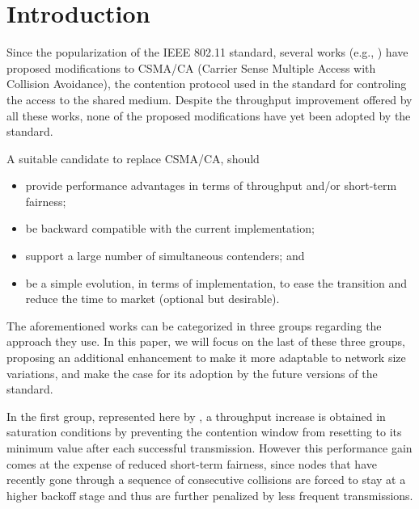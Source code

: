 \documentclass[conference]{IEEEtran}
\begin{document}
%
\IEEEpeerreviewmaketitle



\section{Introduction}

Since the popularization of the IEEE 802.11 standard, several works (e.g.,  \cite{bharghavan1994map,wang2004ncr,cali2000dti,lopez-toledo2006aoi,
barcelo2008lba,bellalta2009vtc,he2009srb,barcelo2010fcc,fang2011dlm,hui2011epp,barcelo2011tcf}) have proposed modifications to CSMA/CA (Carrier Sense Multiple Access with Collision Avoidance), the contention protocol used in the standard for controling the access to the shared medium. {Despite the throughput improvement offered by all these works, none of the proposed modifications have yet been adopted by the standard.}

A suitable candidate to replace CSMA/CA, should
\begin{itemize}
  \item provide performance advantages in terms of throughput and/or short-term fairness;
  \item be backward compatible with the current implementation;
  \item support a large number of simultaneous contenders; and
  \item be a simple evolution, in terms of implementation, to ease the transition and reduce the time to market (optional but desirable).
\end{itemize}

The aforementioned works can be categorized in three groups regarding the approach they use. {In this paper, we will focus on the last of these three groups, proposing an additional enhancement to make it more adaptable to network size variations, and make the case for its adoption by the future versions of the standard.}

In the first group, represented here by \cite{bharghavan1994map,wang2004ncr}, a throughput increase is obtained in saturation conditions by preventing the contention window from resetting to its minimum value after each successful transmission. However this performance gain comes at the expense of reduced short-term fairness, since nodes that have recently gone through a sequence of consecutive collisions are forced to stay at a higher backoff stage and thus are further penalized by less frequent transmissions.
\end{document}
